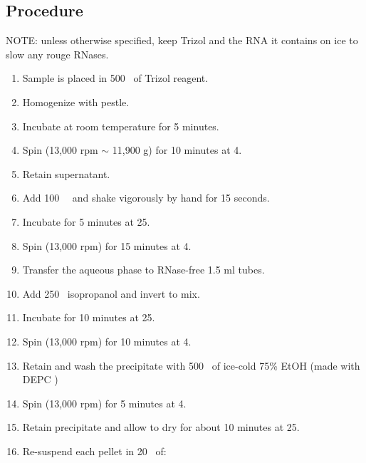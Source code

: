 \subsection{Procedure}
\alert{\sffamily NOTE: unless otherwise specified, keep Trizol and the RNA it contains on ice to slow any rouge RNases.}
\begin{enumerate} \raggedright
	\item \chkBox Sample is placed in 500 \mul\ of Trizol reagent.
	\item \chkBox Homogenize with pestle.
	\item \chkBox Incubate at room temperature for 5 minutes.
	\item \chkBox Spin (13,000 rpm $\sim$ 11,900 g) for 10 minutes at \alert{4\C}.
	\item \chkBox Retain supernatant.  
	\item \chkBox Add 100 \mul\ \chlf\ and shake vigorously by hand for 15 seconds.
	\item \chkBox Incubate for 5 minutes at 25\C.
	\item \chkBox Spin (13,000 rpm) for 15 minutes at \alert{4\C}.
	\item \chkBox Transfer the aqueous phase to \alert{RNase-free} 1.5 ml tubes.  
	\item \chkBox Add 250 \mul\ isopropanol and invert to mix.
	\item \chkBox Incubate for 10 minutes at 25\C.
	\item \chkBox Spin (13,000 rpm) for 10 minutes at \alert{4\C}.
	\item \chkBox Retain and wash the precipitate with 500 \mul\ of ice-cold 75\% EtOH (\alert{made with DEPC \water})
	\item \chkBox Spin (13,000 rpm) for 5 minutes at \alert{4\C}.
	\item \chkBox Retain precipitate and allow to dry for about 10 minutes at 25\C. 
	\item \chkBox Re-suspend each pellet in 20 \mul\ of:
\end{enumerate}


